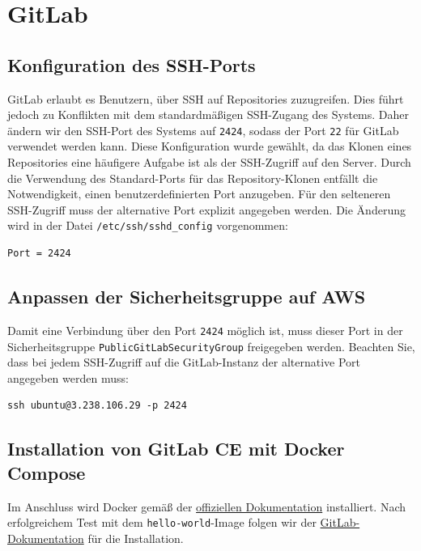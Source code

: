 \documentclass[a4paper,12pt]{article}
\begin{document}
\newpage

\section{GitLab}

\subsection{Konfiguration des SSH-Ports}
GitLab erlaubt es Benutzern, über SSH auf Repositories zuzugreifen. Dies führt jedoch zu Konflikten mit dem standardmäßigen SSH-Zugang des Systems. Daher ändern wir den SSH-Port des Systems auf \texttt{2424}, sodass der Port \texttt{22} für GitLab verwendet werden kann.
Diese Konfiguration wurde gewählt, da das Klonen eines Repositories eine häufigere Aufgabe ist als der SSH-Zugriff auf den Server. Durch die Verwendung des Standard-Ports für das Repository-Klonen entfällt die Notwendigkeit, einen benutzerdefinierten Port anzugeben. Für den selteneren SSH-Zugriff muss der alternative Port explizit angegeben werden.
Die Änderung wird in der Datei \texttt{/etc/ssh/sshd\_config} vorgenommen:

\begin{verbatim}
Port = 2424
\end{verbatim}

\subsection{Anpassen der Sicherheitsgruppe auf AWS}
Damit eine Verbindung über den Port \texttt{2424} möglich ist, muss dieser Port in der Sicherheitsgruppe \texttt{PublicGitLabSecurityGroup} freigegeben werden. Beachten Sie, dass bei jedem SSH-Zugriff auf die GitLab-Instanz der alternative Port angegeben werden muss:

\begin{verbatim}
ssh ubuntu@3.238.106.29 -p 2424
\end{verbatim}

\subsection{Installation von GitLab CE mit Docker Compose}

Im Anschluss wird Docker gemäß der \href{https://docs.docker.com/engine/install/ubuntu/}{offiziellen Dokumentation} installiert. Nach erfolgreichem Test mit dem \texttt{hello-world}-Image folgen wir der \href{https://docs.gitlab.com/ee/install/docker/installation.html}{GitLab-Dokumentation} für die Installation.
\end{document}
